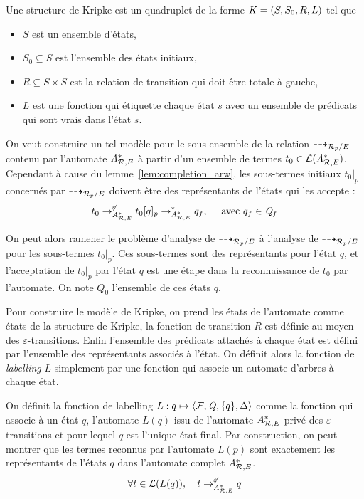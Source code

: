 \begin{definition}
Une structure de Kripke est un quadruplet de la forme $\mathit K = (S, S_0, R, L)$ tel que
\begin{itemize}
\item $S$ est un ensemble d'états,
\item $S_0 \subseteq S$ est l'ensemble des états initiaux,
\item $R \subseteq S \times S$ est la relation de transition qui doit être totale à gauche,
\item $L$ est une fonction qui étiquette chaque état $s$ avec un ensemble de prédicats qui sont vrais 
  dans l'état $s$.
\end{itemize}
\end{definition}

On veut construire un tel modèle pour le sous-ensemble de la relation $\dashrightarrow_{\mathcal R_p/E}$ contenu par l'automate ${\mathit A}_{\mathcal R,E}^*$
à partir d'un ensemble de termes $t_0 \in \mathcal{L}({\mathit A}_{\mathcal R,E}^*)$. Cependant à cause du lemme~\ref{lem:completion_arw}, les sous-termes
initiaux $t_0|_p$  concernés par $\dashrightarrow_{\mathcal R_p/E}$ doivent être des représentants de l'états qui les accepte :
\begin{equation*}
  \label{eq:1}
  t_0 \rightarrow^{\not\varepsilon}_{{\mathit A}_{\mathcal R,E}^*} t_0[q]_p \rightarrow_{{\mathit A}_{\mathcal R,E}^*}^* q_f,\quad \textrm{ avec } q_f \in \mathit Q_f
\end{equation*}

On peut alors ramener le problème d'analyse de $\dashrightarrow_{\mathcal R_p/E}$ à l'analyse de $\dashrightarrow_{\mathcal R_p/E}$ pour les sous-termes $t_0|_p$.
Ces sous-termes sont des représentants pour l'état $q$, et l'acceptation de $t_0|_p$ par l'état $q$ est une étape dans la
reconnaissance de $t_0$ par l'automate. On note $Q_0$ l'ensemble de ces états $q$.

Pour construire le modèle de Kripke, on prend les états de l'automate comme états de la structure de Kripke, 
la fonction de transition $R$ est définie au moyen des $\varepsilon$-transitions.
Enfin l'ensemble des prédicats attachés à  chaque état est défini par l'ensemble des représentants associés à l'état. 
On définit alors la fonction de \textit{labelling} $L$ simplement par une fonction qui associe un automate d'arbres à chaque état.

\begin{definition}
  On définit la fonction de labelling $L : q \mapsto \langle \mathcal{F}, \mathit Q, \{q\}, \Delta\rangle$ comme la fonction
  qui associe à un état $q$, l'automate $L(q)$ issu de l'automate ${\mathit A}_{\mathcal R,E}^*$ privé des $\varepsilon$-transitions
  et pour lequel $q$ est l'unique état final.
  Par construction, on peut montrer que les termes reconnus par l'automate $L(p)$ sont exactement les représentants
  de l'états $q$ dans l'automate complet ${\mathit A}_{\mathcal R,E}^*$.
  \[\forall t \in \mathcal{L}(L(q)), \quad t \rightarrow^{\not\varepsilon}_{{\mathit A}_{\mathcal R,E}^*} q\]
\end{definition}

